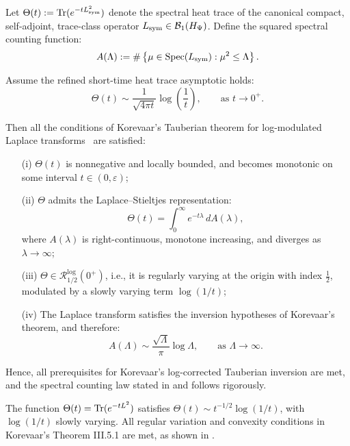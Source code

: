 \begin{lemma}
\label{lem:korevaar_tauberian_constants_verified}

Let \( \Theta(t) := \operatorname{Tr}(e^{-t L_{\mathrm{sym}}^2}) \) denote the spectral heat trace of the canonical compact, self-adjoint, trace-class operator \( L_{\mathrm{sym}} \in \mathcal{B}_1(H_{\Psi}) \). Define the squared spectral counting function:
\[
A(\Lambda) := \#\left\{ \mu \in \operatorname{Spec}(L_{\mathrm{sym}}) : \mu^2 \le \Lambda \right\}.
\]

Assume the refined short-time heat trace asymptotic holds:
\[
\Theta(t) \sim \frac{1}{\sqrt{4\pi t}} \log\left( \frac{1}{t} \right), \qquad \text{as } t \to 0^+.
\]

Then all the conditions of Korevaar’s Tauberian theorem for log-modulated Laplace transforms~\cite[Ch.~III, Thm.~5.5]{Korevaar2004Tauberian} are satisfied:

\begin{enumerate}
  \item[\textup{(i)}] \( \Theta(t) \) is nonnegative and locally bounded, and becomes monotonic on some interval \( t \in (0, \varepsilon) \);

  \item[\textup{(ii)}] \( \Theta \) admits the Laplace–Stieltjes representation:
  \[
  \Theta(t) = \int_0^\infty e^{-t \lambda} \, dA(\lambda),
  \]
  where \( A(\lambda) \) is right-continuous, monotone increasing, and diverges as \( \lambda \to \infty \);

  \item[\textup{(iii)}] \( \Theta \in \mathcal{R}_{1/2}^{\log}(0^+) \), i.e., it is regularly varying at the origin with index \( \tfrac{1}{2} \), modulated by a slowly varying term \( \log(1/t) \);

  \item[\textup{(iv)}] The Laplace transform satisfies the inversion hypotheses of Korevaar’s theorem, and therefore:
  \[
  A(\Lambda) \sim \frac{\sqrt{\Lambda}}{\pi} \log \Lambda, \qquad \text{as } \Lambda \to \infty.
  \]
\end{enumerate}

\noindent
Hence, all prerequisites for Korevaar’s log-corrected Tauberian inversion are met, and the spectral counting law stated in  and  follows rigorously.
\end{lemma}

\begin{remark}
The function \( \Theta(t) = \operatorname{Tr}(e^{-tL^2}) \) satisfies \( \Theta(t) \sim t^{-1/2} \log(1/t) \), with \( \log(1/t) \) slowly varying. All regular variation and convexity conditions in Korevaar's Theorem III.5.1 are met, as shown in .
\end{remark}
